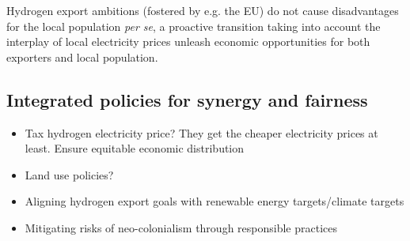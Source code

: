 Hydrogen export ambitions (fostered by e.g. the EU) do not cause disadvantages for the local population \textit{per se}, a proactive transition taking into account the interplay of local electricity prices unleash economic opportunities for both exporters and local population.





\subsection{Integrated policies for synergy and fairness}
\label{subsec:fairness}

\begin{itemize}
    \item Tax hydrogen electricity price? They get the cheaper electricity prices at least. Ensure equitable economic distribution
    \item Land use policies?
    \item Aligning hydrogen export goals with renewable energy targets/climate targets 
    \item Mitigating risks of neo-colonialism through responsible practices
\end{itemize}





